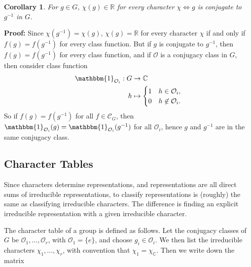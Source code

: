 \documentclass[12pt]{article}
\newtheorem{corollary}{Corollary}[section]
\theoremstyle{definition}
\theoremstyle{remark}
\begin{document}
\begin{corollary}
	For $g \in G$, $\chi(g) \in \mathbb{R}$ for every character $\chi \iff g$ is conjugate to $g^{-1}$ in $G$.
\end{corollary}

\begin{adjustbox}{minipage = \columnwidth - 25.5pt, margin=1em, frame=1pt, margin=0em}
	\textbf{Proof:} Since $\chi(g^{-1}) = \chi(g)$, $\chi(g) = \mathbb{R}$ for every character $\chi$ if and only if $f(g) = f(g^{-1})$ for every class function. But if $g$ is conjugate to $g^{-1}$, then $f(g) = f(g^{-1})$ for every class function, and if $\mathcal{O}$ is a conjugacy class in $G$, then consider class function
	\begin{align*}
		\mathbbm{1}_{\mathcal{O}_i} : G &\to \mathbb{C} \\
		h &\mapsto 
		\begin{cases}
			1 & h \in \mathcal{O}_i, \\
			0 & h \not \in \mathcal{O}_i.
		\end{cases}
	\end{align*}
	So if $f(g) = f(g^{-1})$ for all $f \in \mathcal{C}_G$, then $\mathbbm{1}_{\mathcal{O}_i}(g) = \mathbbm{1}_{\mathcal{O}_i}(g^{-1})$ for all $\mathcal{O}_i$, hence $g$ and $g^{-1}$ are in the same conjugacy class.
\end{adjustbox}

\subsection{Character Tables}%
\label{sub:character_tables}

Since characters determine representations, and representations are all direct sums of irreducible representations, to classify representations is (roughly) the same as classifying irreducible characters. The difference is finding an explicit irreducible representation with a given irreducible character.

The character table of a group is defined as follows. Let the conjugacy classes of $G$ be $\mathcal{O}_1, \ldots, \mathcal{O}_r$, with $\mathcal{O}_1 = \{e\}$, and choose $g_i \in \mathcal{O}_i$. We then list the irreducible characters $\chi_1, \ldots, \chi_r$, with convention that $\chi_1 = \chi_{\mathbb{C}}$. Then we write down the matrix
\end{document}
